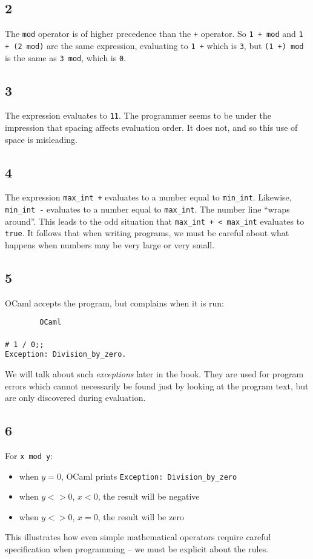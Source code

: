 \documentclass[]{book}
\newcommand{\smspace}{\vspace{4mm}}
\begin{document}
\subsection*{2}
The \texttt{mod} operator is of higher precedence than the \texttt{+} operator. So \texttt{1\! +\! mod} and \texttt{1\! +\! (2\! mod)} are the same expression, evaluating to \texttt{1\! +} which is \texttt{3}, but \texttt{(1\! +)\! mod} is the same as \texttt{3\! mod}, which is \texttt{0}.

\subsection*{3}
The expression evaluates to \texttt{11}. The programmer seems to be under the  impression that spacing affects evaluation order. It does not, and so this use of space is misleading.

\subsection*{4}
The expression \texttt{max\_int\! +} evaluates to a number equal to \texttt{min\_int}. Likewise, \texttt{min\_int\! -} evaluates to a number equal to \texttt{max\_int}. The number line ``wraps around''. This leads to the odd situation that \texttt{max\_int\! +\! <\! max\_int} evaluates to \texttt{true}. It follows that when writing programs, we must be careful about what happens when numbers may be very large or very small.

\subsection*{5}
OCaml accepts the program, but complains when it is run:

\smspace
\noindent\verb!        OCaml!\\
\noindent\\
\noindent\verb!# 1 / 0;;!\\
\noindent\texttt{Exception:\ Division\_by\_zero.}
\smspace

\noindent We will talk about such \textit{exceptions} later in the book. They are used for program errors which cannot necessarily be found just by looking at the program text, but are only discovered during evaluation.

\subsection*{6}
For \texttt{x\! mod\! y}:
  \begin{itemize}
    \item[] when $y = 0$, OCaml prints \texttt{Exception:\ Division\_by\_zero}
    \item[] when $y <> 0$, $x < 0$, the result will be negative
    \item[] when $y <> 0$, $x = 0$, the result will be zero
  \end{itemize}
This illustrates how even simple mathematical operators require careful specification when programming -- we must be explicit about the rules.
\end{document}
